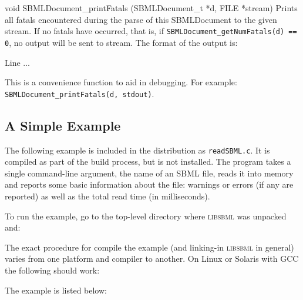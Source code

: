 \documentclass{sbmlmanual}
\begin{document}
\begin{methoddef}{void SBMLDocument\_printFatals (SBMLDocument\_t *d,
FILE *stream)}
  Prints all fatals encountered during the parse of this SBMLDocument
  to the given stream.  If no fatals have occurred, that is, if
  \texttt{SBMLDocument\_getNumFatals(d) == 0}, no output will be sent
  to stream. The format of the output is:
  \begin{example}
      Line %
      ...
  \end{example}
  This is a convenience function to aid in debugging.  For example:\\
  \texttt{SBMLDocument\_printFatals(d, stdout)}.
 \end{methoddef}


\subsection{A Simple Example}
\label{sec:read-example}

The following example is included in the distribution as
\texttt{readSBML.c}.  It is compiled as part of the build process, but
is not installed.  The program takes a single command-line argument,
the name of an SBML file, reads it into memory and reports some basic
information about the file: warnings or errors (if any are reported)
as well as the total read time (in milliseconds).

To run the example, go to the top-level directory where
\textsc{libsbml} was unpacked and:

\begin{example}[csh]
\end{example}


The exact procedure for compile the example (and linking-in
\textsc{libsbml} in general) varies from one platform and compiler to
another.  On Linux or Solaris with GCC the following should work:

\begin{example}[csh]
\end{example}


The example is listed below:
\end{document}
